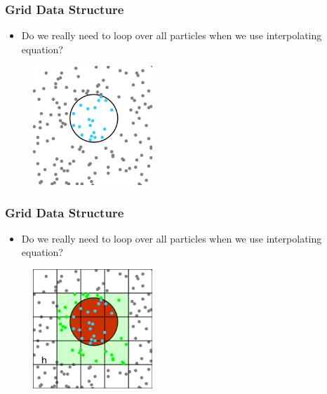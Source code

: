\documentclass[aspectratio=169]{beamer}
\begin{document}
\begin{frame}
\frametitle{Grid Data Structure}
\begin{itemize}
\item Do we really need to loop over all particles when we use interpolating equation?
\end{itemize}
\begin{figure}
\includegraphics[width=0.4\textwidth]{pictures/grid1.png}
\end{figure}
\end{frame}





\begin{frame}
\frametitle{Grid Data Structure}
\begin{itemize}
\item Do we really need to loop over all particles when we use interpolating equation?
\end{itemize}
\begin{figure}
\includegraphics[width=0.4\textwidth]{pictures/grid2.png}
\end{figure}
\end{frame}
\end{document}
